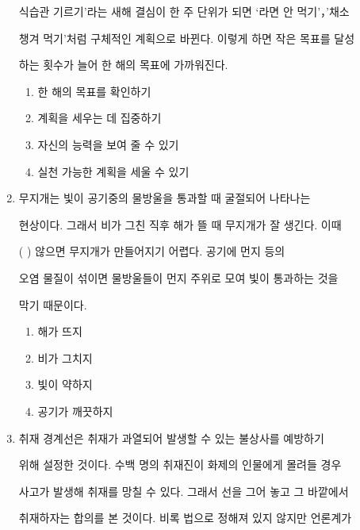 \documentclass[12pt]{article}
\begin{document}
\begin{enumerate}[1.]
\begin{mdframed}
    식습관 기르기’라는 새해 결심이 한 주 단위가 되면 ‘라면 안 먹기’，'채소

    챙겨 먹기’처럼 구체적인 계획으로 바뀐다. 이렇게 하면 작은 목표를 달성

    하는 횟수가 늘어 한 해의 목표에 가까워진다.
    \end{mdframed}

    \begin{enumerate}[1)]
        \item 한 해의 목표를 확인하기
        \item 계획을 세우는 데 집중하기
        \item 자신의 능력을 보여 줄 수 있기
        \item 실천 가능한 계획을 세울 수 있기
    \end{enumerate}


    \item

    \begin{mdframed}
    무지개는 빛이 공기중의 물방울을 통과할 때 굴절되어 나타나는

    현상이다. 그래서 비가 그친 직후 해가 뜰 때 무지개가 잘 생긴다. 이때

    (      ) 않으면 무지개가 만들어지기 어렵다. 공기에 먼지 등의

    오염 물질이 섞이면 물방울들이 먼지 주위로 모여 빛이 통과하는 것을

    막기 때문이다.
    \end{mdframed}

    \begin{enumerate}[1)]
        \item 해가 뜨지
        \item 비가 그치지
        \item 빛이 약하지
        \item 공기가 깨끗하지
    \end{enumerate}


    \item

    \begin{mdframed}
    취재 경계선은 취재가 과열되어 발생할 수 있는 불상사를 예방하기

    위해 설정한 것이다. 수백 명의 취재진이 화제의 인물에게 몰려들 경우

    사고가 발생해 취재를 망칠 수 있다. 그래서 선을 그어 놓고 그 바깥에서

    취재하자는 합의를 본 것이다. 비록 법으로 정해져 있지 않지만 언론계가


\end{mdframed}
\end{enumerate}
\end{document}
